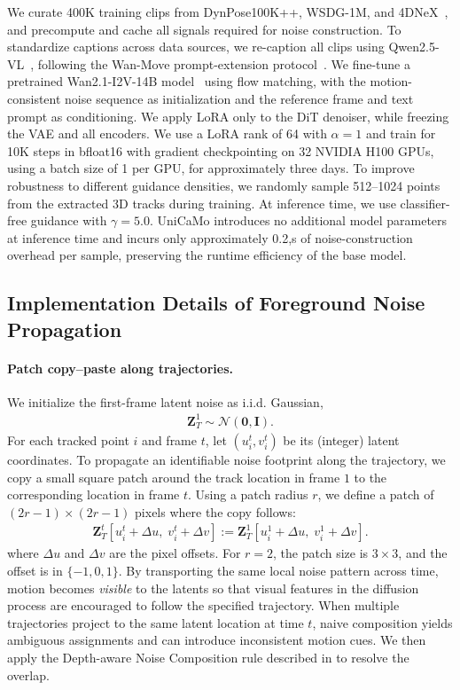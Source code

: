 We curate 400K training clips from DynPose100K++, WSDG-1M, and 4DNeX~\citep{huang2025vipe,chen20254dnex}, and precompute and cache all signals required for noise construction. To standardize captions across data sources, we re-caption all clips using Qwen2.5-VL~\citep{bai2025qwen3}, following the Wan-Move prompt-extension protocol~\citep{chu2025wan}. We fine-tune a pretrained Wan2.1-I2V-14B model~\citep{wanvideo} using flow matching, with the motion-consistent noise sequence as initialization and the reference frame and text prompt as conditioning. We apply LoRA only to the DiT denoiser, while freezing the VAE and all encoders. We use a LoRA rank of 64 with $\alpha{=}1$ and train for 10K steps in bfloat16 with gradient checkpointing on 32 NVIDIA H100 GPUs, using a batch size of 1 per GPU, for approximately three days. To improve robustness to different guidance densities, we randomly sample 512–1024 points from the extracted 3D tracks during training. At inference time, we use classifier-free guidance with $\gamma{=}5.0$. UniCaMo introduces no additional model parameters at inference time and incurs only approximately 0.2,s of noise-construction overhead per sample, preserving the runtime efficiency of the base model.


\subsection{Implementation Details of Foreground Noise Propagation}
\label{sec:track_the_noise_imple}
\paragraph{Patch copy--paste along trajectories.}
We initialize the first-frame latent noise as i.i.d. Gaussian,
\begin{align}
\mathbf{Z}_T^{1} \sim \mathcal{N}(\mathbf{0}, \mathbf{I}).
\end{align}
For each tracked point $i$ and frame $t$, let $(u_i^t, v_i^t)$ be its (integer) latent coordinates.
To propagate an identifiable noise footprint along the trajectory, we copy a small square patch around the track location in frame $1$ to the corresponding location in frame $t$.
Using a patch radius $r$, we define a patch of  $(2r{-}1)\times(2r{-}1)$ pixels where the copy follows:
\begin{align}
\mathbf{Z}_T^{t}\!\left[u_i^t+\Delta u,\; v_i^t+\Delta v\right]
:=
\mathbf{Z}_T^{1}\!\left[u_i^1+\Delta u,\; v_i^1+\Delta v\right].
\end{align}
where $\Delta u$ and $\Delta v$ are the pixel offsets. 
For $r=2$, the patch size is $3\times 3$, and the offset is
in $\{-1,0,1\}$. 
By transporting the same local noise pattern across time, motion becomes \emph{visible} to the latents so that visual features in the diffusion process are encouraged to follow the specified trajectory.
When multiple trajectories project to the same latent location at time $t$, naive composition yields ambiguous assignments and can introduce inconsistent motion cues. We then apply the Depth-aware Noise Composition rule described in  to resolve the overlap.


